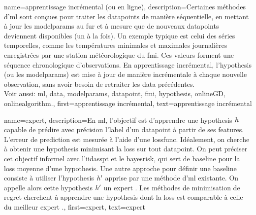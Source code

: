 {
	name={apprentissage incrémental (ou en ligne)},
	description={Certaines méthodes d’\gls{ml}  sont conçues pour traiter les \glspl{datapoint} 
		de manière séquentielle, en mettant à jour les \gls{modelparams} au fur et à mesure que 
		de nouveaux \glspl{datapoint} deviennent disponibles (un à la fois). 
		Un exemple typique est celui des séries temporelles, comme les températures minimales et maximales
		journalières enregistrées par une station météorologique du \gls{fmi}. Ces valeurs forment 
		une séquence chronologique d’observations. En apprentissage incrémental, l’\gls{hypothesis} (ou les \gls{modelparams}) 
		est mise à jour de manière incrémentale à chaque nouvelle observation, sans avoir besoin de 
		retraiter les \gls{data} précédentes. \\
		Voir aussi: \gls{ml}, \gls{data}, \gls{modelparams}, \gls{datapoint}, \gls{fmi}, \gls{hypothesis}, \gls{onlineGD}, \gls{onlinealgorithm}.},
	first={apprentissage incrémental},
	text={apprentissage incrémental}
}

{
	name={expert},
	description={En \gls{ml}, l'objectif est d'apprendre une \gls{hypothesis} $h$ capable de prédire avec précision l'\gls{label} 
		d'un \gls{datapoint} à partir de ses \glspl{feature}. L'erreur de \gls{prediction} est mesurée à l'aide d'une \gls{lossfunc}. 
		Idéalement, on cherche à obtenir une \gls{hypothesis} minimisant la \gls{loss} sur tout \gls{datapoint}. 
		On peut préciser cet objectif informel avec l'\gls{iidasspt} et le \gls{bayesrisk}, qui sert de \gls{baseline} pour la \gls{loss} moyenne d'une \gls{hypothesis}. 
		Une autre approche pour définir une \gls{baseline} consiste à utiliser l'\gls{hypothesis} $h'$ apprise par une méthode d’\gls{ml} existante. 
		On appelle alors cette \gls{hypothesis} $h'$ un expert \cite{PredictionLearningGames}. 
		Les méthodes de minimisation de \gls{regret} cherchent à apprendre une \gls{hypothesis} dont la \gls{loss} est comparable à celle du meilleur expert \cite{PredictionLearningGames,HazanOCO}.},
	first={expert},
	text={expert}
}


